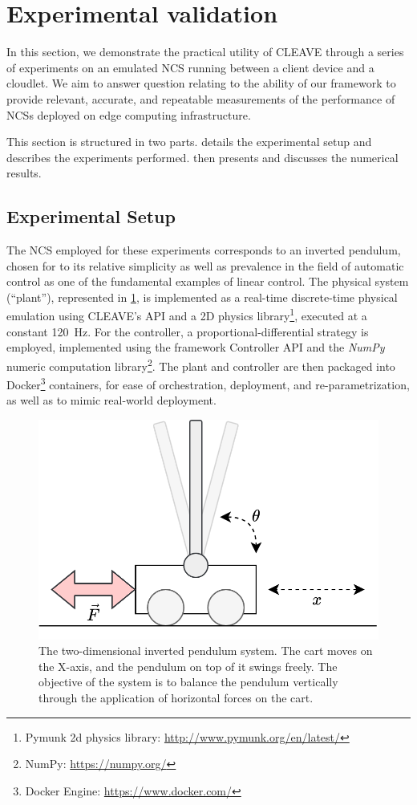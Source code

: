 \section{Experimental validation}\label{sec:experiments}



In this section, we demonstrate the practical utility of \ac{CLEAVE} through a series of experiments on an emulated \ac{NCS} running between a client device and a cloudlet.
We aim to answer question relating to the ability of our framework to provide relevant, accurate, and repeatable measurements of the performance of \acp{NCS} deployed on edge computing infrastructure.

This section is structured in two parts.
 details the experimental setup and describes the experiments performed.
 then presents and discusses the numerical results.

\subsection{Experimental Setup}\label{ssec:expsetup}

The \acl{NCS} employed for these experiments corresponds to an inverted pendulum, chosen for to its relative simplicity as well as prevalence in the field of automatic control as one of the fundamental examples of linear control.
The physical system (``plant''), represented in \cref{fig:invpend}, is implemented as a real-time discrete-time physical emulation using CLEAVE's API and a 2D physics library\footnote{Pymunk 2d physics library: \url{http://www.pymunk.org/en/latest/}}, executed at a constant \SI{120}{\hertz}.
For the controller, a proportional-differential strategy is employed, implemented using the framework Controller API and the \emph{NumPy} numeric computation library\footnote{NumPy: \url{https://numpy.org/}}.
The plant and controller are then packaged into Docker\footnote{Docker Engine: \url{https://www.docker.com/}} containers, for ease of orchestration, deployment, and re-parametrization, as well as to mimic real-world deployment.

\begin{figure}
    \centering
    \includegraphics[width=.7\columnwidth]{images/inverted_pendulum.png}
    \caption{
        The two-dimensional inverted pendulum system.
        The cart moves on the X-axis, and the pendulum on top of it swings freely.
        The objective of the system is to balance the pendulum vertically through the application of horizontal forces on the cart.
    }\label{fig:invpend}
\end{figure}

